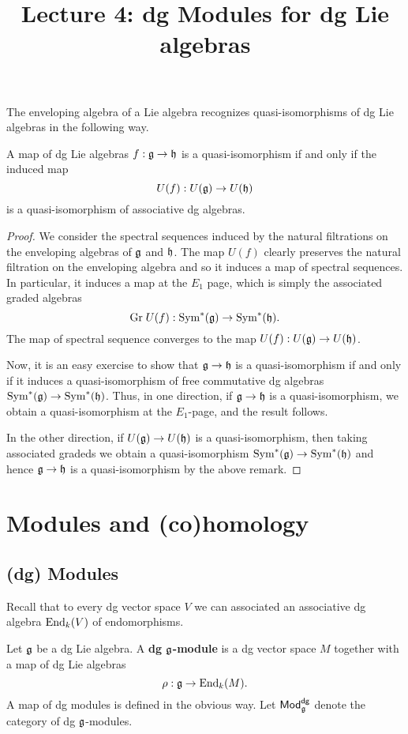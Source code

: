 \documentclass[11pt]{amsart}
\title{Lecture 4: dg Modules for dg Lie algebras}
\def\dgMod{{\sf Mod}^{\sf dg}}
\begin{document}
\maketitle

The enveloping algebra of a Lie algebra recognizes quasi-isomorphisms of dg Lie algebras in the following way.

\begin{lem}
A map of dg Lie algebras $f : \mathfrak g \to \mathfrak h$ is a quasi-isomorphism if and only if the induced map
\[
U(f) : U(\mathfrak g) \to U(\mathfrak h)
\]
is a quasi-isomorphism of associative dg algebras. 
\end{lem}
\begin{proof}
We consider the spectral sequences induced by the natural filtrations on the enveloping algebras of $\mathfrak g$ and $\mathfrak h$. 
The map $U(f)$ clearly preserves the natural filtration on the enveloping algebra and so it induces a map of spectral sequences. 
In particular, it induces a map at the $E_1$ page, which is simply the associated graded algebras
\[
{\rm Gr} \; U(f) : {\rm Sym}^*(\mathfrak g) \to {\rm Sym}^*(\mathfrak h) .
\] 
The map of spectral sequence converges to the map $U(f) : U(\mathfrak g) \to U(\mathfrak h)$. 

Now, it is an easy exercise to show that $\mathfrak g \to \mathfrak h$ is a quasi-isomorphism if and only if it induces a quasi-isomorphism of free commutative dg algebras ${\rm Sym}^*(\mathfrak g) \to {\rm Sym}^*(\mathfrak h)$. 
Thus, in one direction, if $\mathfrak g \to \mathfrak h$ is a quasi-isomorphism, we obtain a quasi-isomorphism at the $E_1$-page, and the result follows. 

In the other direction, if $U(\mathfrak g) \to U(\mathfrak h)$ is a quasi-isomorphism, then taking associated gradeds we obtain a quasi-isomorphism ${\rm Sym}^*(\mathfrak g) \to {\rm Sym}^*(\mathfrak h)$ and hence $\mathfrak g \to \mathfrak h$ is a quasi-isomorphism by the above remark. 
\end{proof}

\section{Modules and (co)homology}

\subsection{(dg) Modules}

Recall that to every dg vector space $V$ we can associated an associative dg algebra ${\rm End}_k(V)$ of endomorphisms. 

\begin{dfn}
Let $\mathfrak g$ be a dg Lie algebra.
A {\bf dg $\mathfrak g$-module} is a dg vector space $M$ together with a map of dg Lie algebras
\[
\rho : \mathfrak g \to {\rm End}_k(M) .
\]
A map of dg modules is defined in the obvious way. 
Let $\dgMod_{\fg}$ denote the category of dg $\mathfrak g$-modules. 
\end{dfn}
\end{document}
